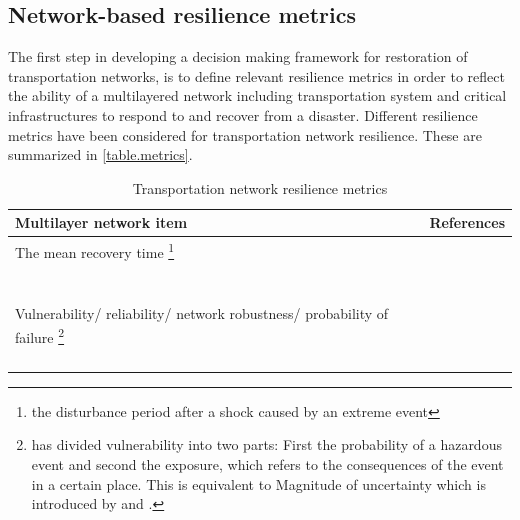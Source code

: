 \documentclass[11pt,twoside]{article}
\numberwithin{equation}{section}
\newcommand{\?}{\stackrel{?}{=}}
\begin{document}
\subsection{Network-based resilience metrics}
The first step in developing a decision making framework for restoration of transportation networks, is to define relevant resilience metrics in order to reflect the ability of a multilayered network including transportation system and critical infrastructures to respond to and recover from a disaster. Different resilience metrics have been considered for transportation network resilience. These are summarized in \autoref{table.metrics}.

\begin{table}[h!]
  \begin{center}
  \scriptsize
  \caption{Transportation network resilience metrics}
    \label{table.metrics}
    \begin{tabular}{p{2in} p{3.5in}}\toprule
      \textbf{Multilayer network item } & \textbf{References} \\\midrule
       The mean recovery time \footnote{the disturbance period after a shock
caused by an extreme event} & \citep{aydin2018framework}\\
      & \citep{ahmed2020resilience}\\
      & \citep{fang2016resiliencebased}\\
      & \cite{almoghathawi2019component}\\
      & \citep{baroud2014inherent}\\
      & \citep{zhang2017resiliencebased}\\
      & \citep{ilbeigi2019statistical}\\
      & \citep{pant2014static} \\ \hline
      Vulnerability/ reliability/ network robustness/ probability of failure \footnote {\citep{jenelius2006importance} has divided vulnerability into two parts: First the probability of a hazardous event and second the exposure, which refers to the consequences of the event in a certain place. This is equivalent to Magnitude of uncertainty which is introduced by \citep{aydin2018framework} and \citep{kermanshah2017robustness}.} &  \citep{aydin2018framework}\\
      &  \citep{ahmed2020resilience}\\
      &  \citep{jenelius2006importance}\\
      &  \citep{almoghathawi2019component}\\
      &  \citep{zhang2016resiliencebased}\\ \hline

\end{tabular}
\end{center}
\end{table}
\end{document}
